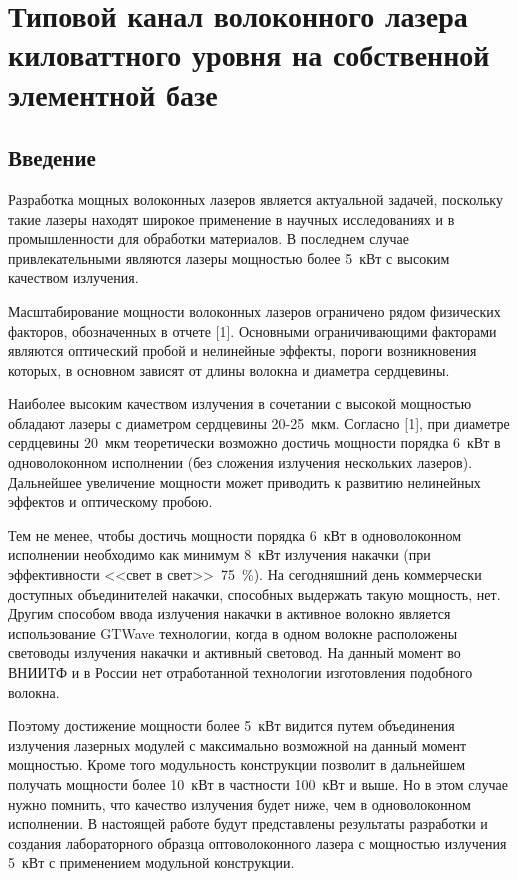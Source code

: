\chapter{Типовой канал волоконного лазера киловаттного уровня на собственной элементной базе}
\label{chapt4}

\section{Введение}
\label{sec:kw-intro}

Разработка мощных волоконных лазеров является актуальной задачей, поскольку такие лазеры находят широкое применение в научных исследованиях и в промышленности для обработки материалов. В последнем случае привлекательными являются лазеры мощностью более 5~кВт с высоким качеством излучения.

Масштабирование мощности волоконных лазеров ограничено рядом физических факторов, обозначенных в отчете [1]. Основными ограничивающими факторами являются оптический пробой и нелинейные эффекты, пороги возникновения которых, в основном зависят от длины волокна и диаметра сердцевины.

Наиболее высоким качеством излучения в сочетании с высокой мощностью обладают лазеры с диаметром сердцевины 20-25~мкм. Согласно [1], при диаметре сердцевины 20~мкм теоретически возможно достичь мощности порядка 6~кВт в одноволоконном исполнении (без сложения излучения нескольких лазеров). Дальнейшее увеличение мощности может приводить к развитию нелинейных эффектов и оптическому пробою.

Тем не менее, чтобы достичь мощности порядка 6~кВт в одноволоконном исполнении необходимо как минимум 8~кВт излучения накачки (при эффективности <<свет в свет>>~75~\%). На сегодняшний день коммерчески доступных объединителей накачки, способных выдержать такую мощность, нет. Другим способом ввода излучения накачки в активное волокно является использование GTWave технологии, когда в одном волокне расположены световоды излучения накачки и активный световод. На данный момент во ВНИИТФ и в России нет отработанной технологии изготовления подобного волокна.

Поэтому достижение мощности более 5~кВт видится путем объединения излучения лазерных модулей с максимально возможной на данный момент мощностью. Кроме того модульность конструкции позволит в дальнейшем получать мощности более 10~кВт в частности 100~кВт и выше. Но в этом случае нужно помнить, что качество излучения будет ниже, чем в одноволоконном исполнении.
В настоящей работе будут представлены результаты разработки и создания лабораторного образца оптоволоконного лазера с мощностью излучения 5~кВт с применением модульной конструкции.

